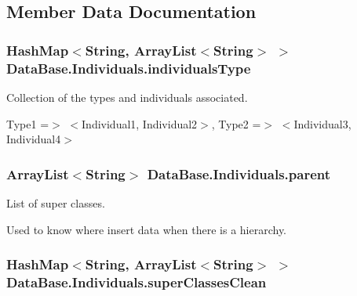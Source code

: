 \subsection{Member Data Documentation}
\hypertarget{class_data_base_1_1_individuals_aca4c53086ef19d23f9d76616f5b67d63}{
\subsubsection[{individualsType}]{\setlength{\rightskip}{0pt plus 5cm}HashMap$<$String, ArrayList$<$String$>$ $>$ {\bf DataBase.Individuals.individualsType}}}
\label{class_data_base_1_1_individuals_aca4c53086ef19d23f9d76616f5b67d63}


Collection of the types and individuals associated. 

Type1 =$>$ $<$Individual1, Individual2$>$, Type2 =$>$ $<$Individual3, Individual4$>$ \hypertarget{class_data_base_1_1_individuals_a67489fb359e36b64fc5621616c87c6f7}{
\subsubsection[{parent}]{\setlength{\rightskip}{0pt plus 5cm}ArrayList$<$String$>$ {\bf DataBase.Individuals.parent}}}
\label{class_data_base_1_1_individuals_a67489fb359e36b64fc5621616c87c6f7}


List of super classes. 

Used to know where insert data when there is a hierarchy. \hypertarget{class_data_base_1_1_individuals_ab96b206dfc1f13a8b96512de40215643}{
\subsubsection[{superClassesClean}]{\setlength{\rightskip}{0pt plus 5cm}HashMap$<$String, ArrayList$<$String$>$ $>$ {\bf DataBase.Individuals.superClassesClean}}}
\label{class_data_base_1_1_individuals_ab96b206dfc1f13a8b96512de40215643}


